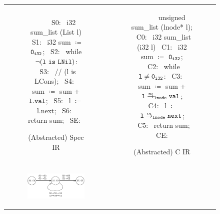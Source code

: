 \begin{figure}
\begin{tabular}{cc}
\begin{subfigure}[b]{0.45\textwidth}
\begin{center}
\begin{allLangEnvFoot}
~{\scriptsize \textcolor{mygray}{   }}~   
~{\scriptsize \textcolor{mygray}{S0:}}~ i32 sum_list (List l) {
~{\scriptsize \textcolor{mygray}{S1:}}~   i32 sum $\coloneqq$ ${\tt 0_{i32}}$;
~{\scriptsize \textcolor{mygray}{S2:}}~   while ${\tt \neg (l\ is\ LNil)}$:
~{\scriptsize \textcolor{mygray}{S3:}}~     // (l is LCons);
~{\scriptsize \textcolor{mygray}{S4:}}~     sum $\coloneqq$ sum + ${\tt l.val}$;
~{\scriptsize \textcolor{mygray}{S5:}}~     l   $\coloneqq$ l.next;
~{\scriptsize \textcolor{mygray}{S6:}}~   return sum;
~{\scriptsize \textcolor{mygray}{SE:}}~ }
\end{allLangEnvFoot}
\end{center}
\caption{\label{fig:llTraverseSpec}(Abstracted) Spec IR}
\end{subfigure}%
&
\begin{subfigure}[b]{0.55\textwidth}
\begin{center}
\begin{allLangEnvFoot}
~{\scriptsize \textcolor{mygray}{\ \ \ }}~ unsigned sum_list (lnode* l);
~{\scriptsize \textcolor{mygray}{C0:}}~ i32 sum_list (i32 l) {
~{\scriptsize \textcolor{mygray}{C1:}}~   i32 sum $\coloneqq$ ${\tt 0_{i32}}$;
~{\scriptsize \textcolor{mygray}{C2:}}~   while ${\tt l \neq 0_{i32}}$:
~{\scriptsize \textcolor{mygray}{C3:}}~     sum $\coloneqq$ sum + $\structPointer{\tt l}{m}{lnode}{val}$;
~{\scriptsize \textcolor{mygray}{C4:}}~     l   $\coloneqq$ $\structPointer{\tt l}{m}{lnode}{next}$;
~{\scriptsize \textcolor{mygray}{C5:}}~   return sum;
~{\scriptsize \textcolor{mygray}{CE:}}~ }
\end{allLangEnvFoot}
\end{center}
\caption{\label{fig:llTraverseC}(Abstracted) C IR}
\end{subfigure}%
\\
\begin{subfigure}[b]{0.45\textwidth}
\begin{center}
{\includegraphics[scale=1.1]{chapters/figures/figSumListProductCfg.pdf}}

\end{center}
\end{subfigure}
\end{tabular}
\end{figure}
